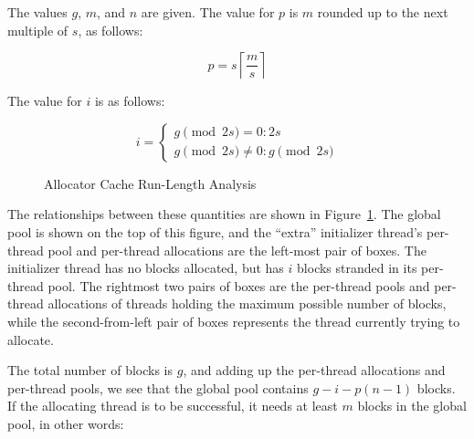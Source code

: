 {{	The values $g$, $m$, and $n$ are given.
	The value for $p$ is $m$ rounded up to the next multiple of $s$,
	as follows:

	\begin{equation}
		p = s \left \lceil \frac{m}{s} \right \rceil
	\label{sec:SMPdesign:p}
	\end{equation}

	The value for $i$ is as follows:

	\begin{equation}
		i = \left \{
			\begin{array}{l}
				g \pmod{2 s} = 0: 2 s \\
				g \pmod{2 s} \ne 0: g \pmod{2 s}
			\end{array}
		    \right .
	\label{sec:SMPdesign:i}
	\end{equation}

	\begin{figure}
	\centering
	\caption{Allocator Cache Run-Length Analysis}
	\label{fig:SMPdesign:Allocator Cache Run-Length Analysis}
	\end{figure}

	The relationships between these quantities are shown in
	Figure~\ref{fig:SMPdesign:Allocator Cache Run-Length Analysis}.
	The global pool is shown on the top of this figure, and
	the ``extra'' initializer thread's per-thread pool and
	per-thread allocations are the left-most pair of boxes.
	The initializer thread has no blocks allocated, but has
	$i$ blocks stranded in its per-thread pool.
	The rightmost two pairs of boxes are the per-thread pools and
	per-thread allocations of threads holding the maximum possible
	number of blocks, while the second-from-left pair of boxes
	represents the thread currently trying to allocate.

	The total number of blocks is $g$, and adding up the per-thread
	allocations and per-thread pools, we see that the global pool
	contains $g-i-p(n-1)$ blocks.
	If the allocating thread is to be successful, it needs at least
	$m$ blocks in the global pool, in other words:

}}
